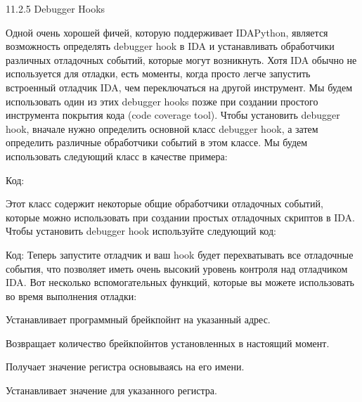 \documentclass[12pt]{book}
\begin{document}
11.2.5 Debugger Hooks

Одной очень хорошей фичей, которую поддерживает IDAPython, является возможность определять debugger hook в IDA и устанавливать обработчики различных отладочных событий, которые могут возникнуть. Хотя IDA обычно не используется для отладки, есть моменты, когда просто легче запустить встроенный отладчик IDA, чем переключаться на другой инструмент. Мы будем использовать один из этих debugger hooks позже при создании простого инструмента покрытия кода (code coverage tool). Чтобы установить debugger hook, вначале нужно определить основной класс debugger hook, а затем определить различные обработчики событий в этом классе. Мы будем использовать следующий класс в качестве примера:

Код:



Этот класс содержит некоторые общие обработчики отладочных событий, которые можно использовать при создании простых отладочных скриптов в IDA. Чтобы установить debugger hook используйте следующий код:

Код:
Теперь запустите отладчик и ваш hook будет перехватывать все отладочные события, что позволяет иметь очень высокий уровень контроля над отладчиком IDA. Вот несколько вспомогательных функций, которые вы можете использовать во время выполнения отладки:

Устанавливает программный брейкпойнт на указанный адрес.

Возвращает количество брейкпойнтов установленных в настоящий момент. 

Получает значение регистра основываясь на его имени.

Устанавливает значение для указанного регистра.
\end{document}
